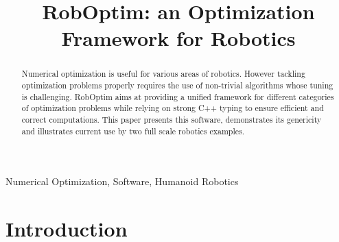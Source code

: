 \documentclass[conference,final,a4paper,twocolumn,9pt]{IEEEtran}
\begin{document}
\title{RobOptim: an Optimization Framework for Robotics}
%
\author{%
%
%
%
%
}%
%
\maketitle

\begin{abstract}
\boldmath Numerical optimization is useful for various areas of
robotics. However tackling optimization problems properly requires the
use of non-trivial algorithms whose tuning is challenging. RobOptim
aims at providing a unified framework for different categories of
optimization problems while relying on strong C++ typing to ensure
efficient and correct computations. This paper presents this software,
demonstrates its genericity and illustrates current use by two full
scale robotics examples.
\end{abstract}

\begin{IEEEkeywords}
  Numerical Optimization, Software, Humanoid Robotics
\end{IEEEkeywords}

\IEEEpeerreviewmaketitle

\section{Introduction}\label{sec:introduction}
\end{document}
